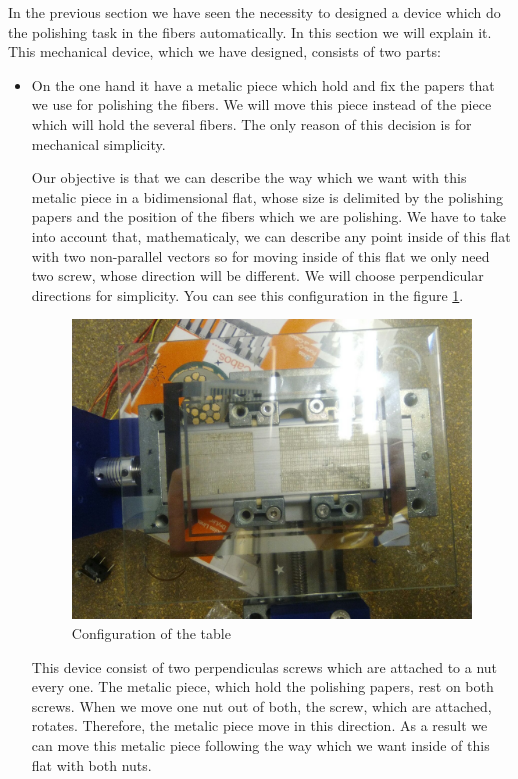 In the previous section we have seen the necessity to designed a device which do the polishing task in the fibers automatically. In this section we will explain it. This mechanical device, which we have designed, consists of two parts:

\begin{itemize}
\item On the one hand it have a metalic piece which hold and fix the papers that we use for polishing the fibers. We will move this piece instead of the piece which will hold the several fibers. The only reason of this decision is for mechanical simplicity.

Our objective is that we can describe the way which we want with this metalic piece in a bidimensional flat, whose size is delimited by the polishing papers and the position of the fibers which we are polishing. We have to take into account that, mathematicaly, we can describe any point inside of this flat with two non-parallel vectors so for moving inside of this flat we only need two screw, whose direction will be different. We will choose perpendicular directions for simplicity. You can see this configuration in the figure \ref{table}.

\begin{figure}[hbtp]
\centering
\includegraphics[scale=0.15]{../Figures/Table.jpeg}
\caption{Configuration of the table\label{table}}
\end{figure}

This device consist of two perpendiculas screws which are attached to a nut every one. The metalic piece, which hold the polishing papers, rest on both screws. When we move one nut out of both, the screw, which are attached, rotates. Therefore, the metalic piece move in this direction. As a result we can move this metalic piece following the way which we want inside of this flat with both nuts.


\end{itemize}
